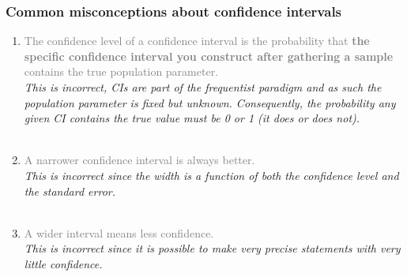 \documentclass[slidestop,compress,mathserif,12pt,t,professionalfonts,xcolor=table]{beamer}
\begin{document}
\begin{frame}
\frametitle{Common misconceptions about confidence intervals}

\begin{enumerate}

\item \textcolor{gray}{The confidence level of a confidence interval is the
    probability that \textbf{the specific confidence interval you construct
      after gathering a sample} contains the true population parameter.} \\
\textit{This is incorrect, CIs are part of the frequentist paradigm and as such the population parameter is fixed but unknown. Consequently, the probability any given CI contains the true value must be 0 or 1 (it does or does not).} \\
$\:$ \\

\pause

\item  \textcolor{gray}{A narrower confidence interval is always better.}\\
\textit{This is incorrect since the width is a function of both the confidence level and the standard error.} \\
$\:$ \\

\pause

\item   \textcolor{gray}{A wider interval means less confidence.} \\
\textit{This is incorrect since it is possible to make very precise statements with very little confidence.} \\

\end{enumerate}


\end{frame}




\end{document}
